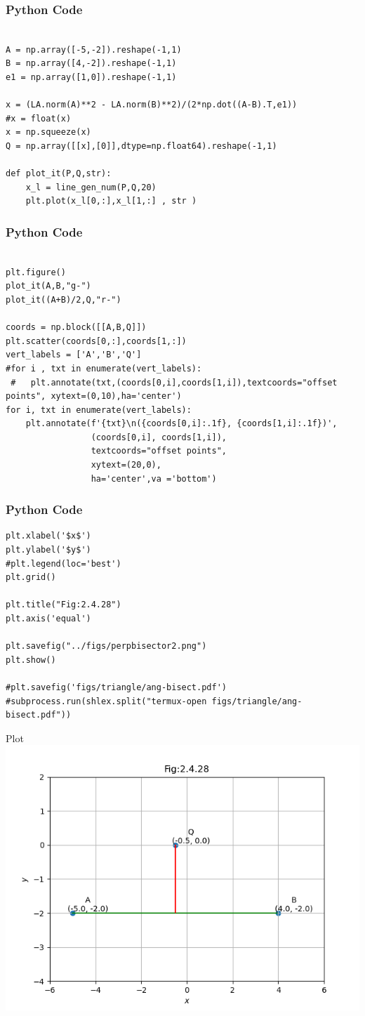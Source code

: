 \documentclass{beamer}
\begin{document}
\begin{frame}[fragile]
    \frametitle{Python Code }
    \begin{lstlisting}

A = np.array([-5,-2]).reshape(-1,1)
B = np.array([4,-2]).reshape(-1,1)
e1 = np.array([1,0]).reshape(-1,1)

x = (LA.norm(A)**2 - LA.norm(B)**2)/(2*np.dot((A-B).T,e1))
#x = float(x)
x = np.squeeze(x)
Q = np.array([[x],[0]],dtype=np.float64).reshape(-1,1)

def plot_it(P,Q,str):
    x_l = line_gen_num(P,Q,20)
    plt.plot(x_l[0,:],x_l[1,:] , str )
\end{lstlisting}
\end{frame}

\begin{frame}[fragile]
    \frametitle{Python Code }
    \begin{lstlisting}

plt.figure()
plot_it(A,B,"g-")
plot_it((A+B)/2,Q,"r-")

coords = np.block([[A,B,Q]])
plt.scatter(coords[0,:],coords[1,:])
vert_labels = ['A','B','Q']
#for i , txt in enumerate(vert_labels):
 #   plt.annotate(txt,(coords[0,i],coords[1,i]),textcoords="offset points", xytext=(0,10),ha='center')
for i, txt in enumerate(vert_labels):
    plt.annotate(f'{txt}\n({coords[0,i]:.1f}, {coords[1,i]:.1f})',
                 (coords[0,i], coords[1,i]),
                 textcoords="offset points",
                 xytext=(20,0),
                 ha='center',va ='bottom')

\end{lstlisting}
\end{frame}

\begin{frame}[fragile]
    \frametitle{Python Code }
    \begin{lstlisting}
plt.xlabel('$x$')
plt.ylabel('$y$')
#plt.legend(loc='best')
plt.grid()

plt.title("Fig:2.4.28")
plt.axis('equal')

plt.savefig("../figs/perpbisector2.png")
plt.show()

#plt.savefig('figs/triangle/ang-bisect.pdf')
#subprocess.run(shlex.split("termux-open figs/triangle/ang-bisect.pdf"))
    \end{lstlisting}
\end{frame}


\begin{frame}{Plot}
    \centering
    \includegraphics[width=\columnwidth, height=0.8\textheight, keepaspectratio]{figs/perpbisector1.png}   
\end{frame}
\end{document}
